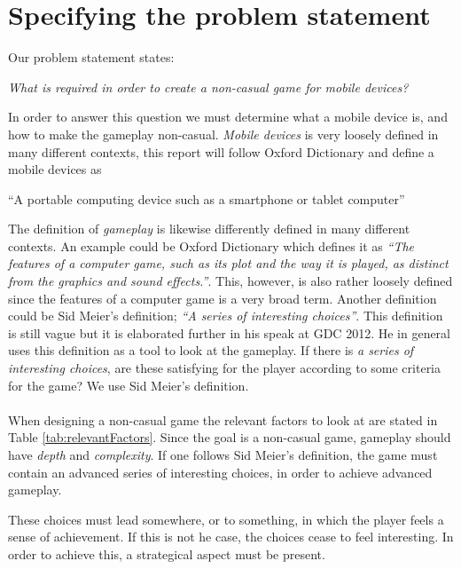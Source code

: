 \section{Specifying the problem statement}
Our problem statement states:

\begin{center}
\textit{What is required in order to create a non-casual game for mobile devices?}
\end{center}

In order to answer this question we must determine what a mobile device is, and how to make the gameplay non-casual.
\textit{Mobile devices} is very loosely defined in many different contexts, this report will follow Oxford Dictionary and define a mobile devices as 
\begin{center}
``A portable computing device such as a smartphone or tablet computer''\cite{mobileOx}
\end{center}

The definition of \textit{gameplay} is likewise differently defined in many different contexts. 
An example could be Oxford Dictionary which defines it as \textit{``The features of a computer game, such as its plot and the way it is played, as distinct from the graphics and sound effects.''}\cite{gameplayOx}. This, however, is also rather loosely defined since the features of a computer game is a very broad term. 
Another definition could be Sid Meier's definition; \textit{``A series of interesting choices''}\cite{GDC2012}. 
This definition is still vague but it is elaborated further in his speak at GDC 2012.\cite{GDC2012}
He in general uses this definition as a tool to look at the gameplay. If there is \textit{a series of interesting choices}, are these satisfying for the player according to some criteria for the game? We use Sid Meier's definition.\\\\

When designing a non-casual game the relevant factors to look at are stated in Table \ref{tab:relevantFactors}.
Since the goal is a non-casual game, gameplay should have \textit{depth} and \textit{complexity}.
If one follows Sid Meier's definition, the game must contain an advanced series of interesting choices, in order to achieve advanced gameplay.

These choices must lead somewhere, or to something, in which the player feels a sense of achievement. If this is not he case, the choices cease to feel interesting. In order to achieve this, a strategical aspect must be present.

